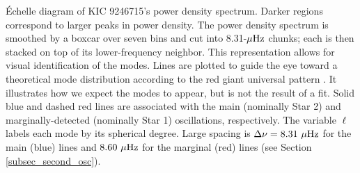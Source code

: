 \label{fig:echelle} \'Echelle diagram of KIC 9246715's power density spectrum. Darker regions correspond to larger peaks in power density. The power density spectrum is smoothed by a boxcar over seven bins and cut into 8.31-$\mu\rm{Hz}$ chunks; each is then stacked on top of its lower-frequency neighbor. This representation allows for visual identification of the modes. Lines are plotted to guide the eye toward a theoretical mode distribution according to the red giant universal pattern \citep{mos11}. It illustrates how we expect the modes to appear, but is not the result of a fit. Solid blue and dashed red lines are associated with the main (nominally Star 2) and marginally-detected (nominally Star 1) oscillations, respectively. The variable $\ell$ labels each mode by its spherical degree. Large spacing is $\Delta\nu = 8.31 \ \mu\rm{Hz}$ for the main (blue) lines and $8.60\ \mu\rm{Hz}$ for the marginal (red) lines (see Section \ref{subsec_second_osc}).

  